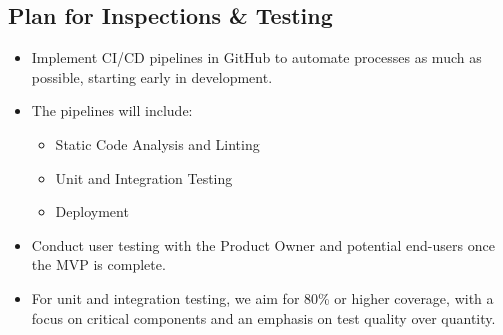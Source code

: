 \begin{comment}
    https://stackoverflow.com/questions/19576742/how-to-clone-all-repos-at-once-from-github
    for auto clone til skyhigh
\end{comment}

\subsection{Plan for Inspections \& Testing}\label{sec:plan_for_inspections_&_testing}

\begin{itemize}
    \item Implement CI/CD pipelines in GitHub to automate processes as much as possible, starting early in development.
    \item The pipelines will include:
    \begin{itemize}
        \item Static Code Analysis and Linting
        \item Unit and Integration Testing
        \item Deployment
    \end{itemize}
    \item Conduct user testing with the Product Owner and potential end-users once the MVP is complete.
    \item For unit and integration testing, we aim for 80\% or higher coverage, with a focus on critical components and an emphasis on test quality over quantity.
\end{itemize}


\begin{comment}
    - GitOps som et sentralt konsept
    - Bruke CI/CD Pipelines i GitHubfor å automatisere så mye som mulig
    f.eks. statiske kodesjekker og inspections, unittester og integrasjonstester, også deployment for å kunne ha manuelle inspeksjoner og tester during development.
    - Linting for Go (eks. golangci-lint).
    - Plan om usertesting etter vi har MVP på plass midt i mars, jobbe utifra kravspesifikasjon og tilbakemelding fra productowner fram til det.
    
\end{comment}

